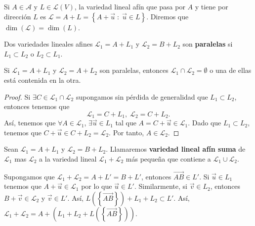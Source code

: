 \begin{observation}
	\normalfont Si $\displaystyle A \in \mathcal{A} $ y $\displaystyle L \in \mathcal{L}\left(V\right) $, la variedad lineal afín que pasa por $\displaystyle A $ y tiene por dirección $\displaystyle L $ es $\displaystyle \mathcal{L} = A + L = \left\{ A +\vec{u} \; : \; \vec{u} \in L\right\}  $. Diremos que $\displaystyle \dim\left(\mathcal{L}\right) = \dim\left(L\right) $.
\end{observation}
\begin{fdefinition}[]
\normalfont Dos variedades lineales afines $\displaystyle \mathcal{L}_{1} = A + L_{1} $ y $\displaystyle \mathcal{L}_{2} = B + L _{2} $ son \textbf{paralelas} si $\displaystyle L_{1} \subset L_{2} $ o $\displaystyle L_{2} \subset L_{1} $.
\end{fdefinition}
\begin{fprop}[]
\normalfont Si $\displaystyle \mathcal{L}_{1} = A + L_{1} $ y $\displaystyle \mathcal{L}_{2} = A + L_{2} $ son paralelas, entonces $\displaystyle \mathcal{L}_{1} \cap \mathcal{L}_{2} = \emptyset $ o una de ellas está contenida en la otra. 
\end{fprop}
\begin{proof}
Si $\displaystyle \exists C \in \mathcal{L}_{1} \cap \mathcal{L}_{2} $ supongamos sin pérdida de generalidad que $\displaystyle L_{1} \subset L_{2} $, entonces tenemos que
\[ \mathcal{L}_{1} = C + L_{1}, \; \mathcal{L}_{2}= C + L_{2} .\]
Así, tenemos que $\displaystyle \forall A \in \mathcal{L}_{1} $, $\displaystyle \exists \vec{u} \in L_{1} $ tal que $\displaystyle A = C + \vec{u} \in \mathcal{L}_{1} $. Dado que $\displaystyle L_{1} \subset L_{2} $, tenemos que $\displaystyle C + \vec{u} \in C + L_{2} = \mathcal{L}_{2} $. Por tanto, $\displaystyle A \in \mathcal{L}_{2} $. 
\end{proof}
\begin{fdefinition}
	\normalfont Sean $\displaystyle \mathcal{L}_{1} = A + L_{1} $ y $\displaystyle \mathcal{L}_{2} = B + L_{2} $. Llamaremos \textbf{variedad lineal afín suma} de $\displaystyle \mathcal{L}_{1} $ mas $\displaystyle \mathcal{L}_{2} $ a la variedad lineal $\displaystyle \mathcal{L}_{1} + \mathcal{L}_{2} $ más pequeña que contiene a $\displaystyle \mathcal{L}_{1} \cup \mathcal{L}_{2} $.
\end{fdefinition}
\begin{observation}
	\normalfont Supongamos que $\displaystyle \mathcal{L}_{1} + \mathcal{L}_{2} = A + L' = B + L' $, entonces $\displaystyle \overrightarrow{AB} \in L'$. Si $\displaystyle \vec{u} \in L_{1} $ tenemos que $\displaystyle A + \vec{u} \in \mathcal{L}_{1} $ por lo que $\displaystyle \vec{u} \in L' $. Similarmente, si $\displaystyle \vec{v} \in L_{2} $, entonces $\displaystyle B + \vec{v} \in \mathcal{L}_{2} $ y $\displaystyle \vec{v} \in L' $. Así, $\displaystyle L\left( \left\{ \overrightarrow{AB}\right\} \right) + L_{1} + L_{2} \subset L' $. Así, $\displaystyle \mathcal{L}_{1} + \mathcal{L}_{2} = A + \left(L_{1} + L_{2} + L\left( \left\{ \overrightarrow{AB}\right\} \right)\right) $. 
\end{observation}
